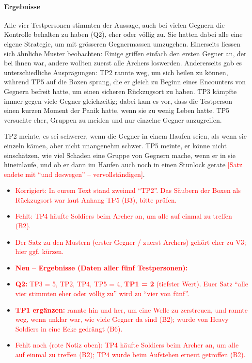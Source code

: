 \documentclass[../Main.tex]{subfiles}
\begin{document}
\paragraph{Ergebnisse}
Alle vier Testpersonen stimmten der Aussage, auch bei vielen Gegnern die Kontrolle behalten zu haben (Q2), eher oder völlig zu. Sie hatten dabei alle eine eigene Strategie, um mit grösseren Gegnermassen umzugehen. Einerseits liessen sich ähnliche Muster beobachten: Einige griffen einfach den ersten Gegner an, der bei ihnen war, andere wollten zuerst alle Archers loswerden. Andererseits gab es unterschiedliche Ausprägungen: TP2 rannte weg, um sich heilen zu können, während TP5 auf die Boxen sprang, die er gleich zu Beginn eines Encounters von Gegnern befreit hatte, um einen sicheren Rückzugsort zu haben. TP3 kämpfte immer gegen viele Gegner gleichzeitig; dabei kam es vor, dass die Testperson einen kurzen Moment der Panik hatte, wenn sie zu wenig Leben hatte. TP5 versuchte eher, Gruppen zu meiden und nur einzelne Gegner anzugreifen.

TP2 meinte, es sei schwerer, wenn die Gegner in einem Haufen seien, als wenn sie einzeln kämen, aber nicht unangenehm schwer. TP5 meinte, er könne nicht einschätzen, wie viel Schaden eine Gruppe von Gegnern mache, wenn er in sie hineinlaufe, und ob er dann im Haufen auch noch in einen Stunlock gerate \textcolor{red}{[Satz endete mit \enquote{und deswegen} -- vervollständigen]}.

\begin{itemize}[leftmargin=1.5cm]
    \item \textcolor{red}{Korrigiert: In eurem Text stand zweimal \enquote{TP2}. Das Säubern der Boxen als Rückzugsort war laut Anhang TP5 (B3), bitte prüfen.}
    \item \textcolor{red}{Fehlt: TP4 häufte Soldiers beim Archer an, um alle auf einmal zu treffen (B2).}
    \item \textcolor{red}{Der Satz zu den Mustern (erster Gegner / zuerst Archers) gehört eher zu V3; hier ggf. kürzen.}
\end{itemize}

\begin{itemize}[leftmargin=1.5cm]
    \item \textcolor{red}{\textbf{Neu -- Ergebnisse (Daten aller fünf Testpersonen):}}
    \item \textcolor{red}{\textbf{Q2:} TP3 = 5, TP2, TP4, TP5 = 4, \textbf{TP1 = 2} (tiefster Wert). Euer Satz \enquote{alle vier stimmten eher oder völlig zu} wird zu \enquote{vier von fünf}.}
    \item \textcolor{red}{\textbf{TP1 ergänzen:} rannte hin und her, um eine Welle zu zerstreuen, und rannte weg, wenn unklar war, wie viele Gegner da sind (B2); wurde von Heavy Soldiers in eine Ecke gedrängt (B6).}
    \item \textcolor{red}{Fehlt noch (rote Notiz oben): TP4 häufte Soldiers beim Archer an, um alle auf einmal zu treffen (B2); TP4 wurde beim Aufstehen erneut getroffen (B2).}
\end{itemize}
\end{document}
